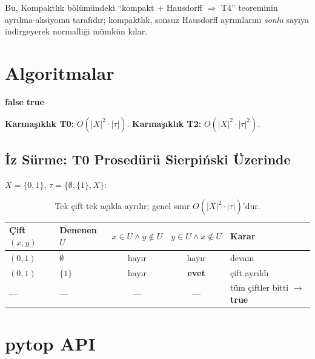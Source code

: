 \noindent Bu, Kompaktlık bölümündeki ``kompakt $+$ Hausdorff
$\Rightarrow$ T4'' teoreminin ayrılma-aksiyomu tarafıdır; kompaktlık, sonsuz
Hausdorff ayrımlarını \emph{sonlu} sayıya indirgeyerek normalliği mümkün kılar.

\section{Algoritmalar}

\begin{algorithm}
\caption{Sonlu T0 Karar Prosedürü}
\begin{algorithmic}[1]
        \Return \textbf{false}
    \EndIf
\EndFor
\Return \textbf{true}
\end{algorithmic}
\end{algorithm}

\noindent\textbf{Karmaşıklık T0:} $O(|X|^2 \cdot |\tau|)$. \quad
\textbf{Karmaşıklık T2:} $O(|X|^2 \cdot |\tau|^2)$.

\subsection{İz Sürme: T0 Prosedürü Sierpiński Üzerinde}

$X=\{0,1\}$, $\tau=\{\emptyset,\{1\},X\}$:

\begin{table}[ht]
\centering
\begin{tabular}{llccl}
\toprule
\textbf{Çift} $(x,y)$ & \textbf{Denenen} $U$ &
$x\in U \wedge y\notin U$ & $y\in U \wedge x\notin U$ & \textbf{Karar} \\
\midrule
$(0,1)$ & $\emptyset$ & hayır & hayır & devam \\
$(0,1)$ & $\{1\}$ & hayır & \textbf{evet} & çift ayrıldı \\
--- & --- & --- & --- & tüm çiftler bitti $\to$ \textbf{true} \\
\bottomrule
\end{tabular}
\caption{Tek çift tek açıkla ayrılır; genel sınır
  $O(|X|^2\cdot|\tau|)$'dur.}
\end{table}

\section{pytop API}

